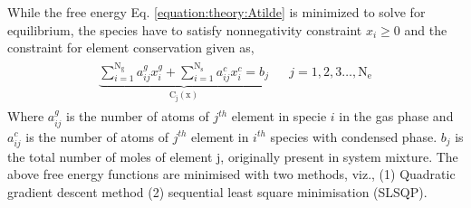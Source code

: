 \documentclass[letterpaper,10pt,english]{sphinxmanual}
\begin{document}
While the free energy Eq. \eqref{equation:theory:Atilde} is minimized to solve for
equilibrium, the species have to satisfy non\sphinxhyphen{}negativity
constraint \(x_i\ge 0\) and the constraint for element
conservation given as,
\begin{equation}\label{equation:theory:constraint_equation}
\begin{split}\begin{align}
\underbrace{\sum_{i = 1}^{\mathrm{N_g}} a_{ij}^{g}
x_{i}^{g} + \sum _{i = 1}^{\mathrm{N_s}} a_{ij}^{c}x_{i}^{c} =
b_j}_{\mathrm{C_j(x)}}            &&j = 1, 2, 3\ldots, \mathrm{N_e}
\end{align}\end{split}
\end{equation}
Where \(a_{ij} ^{g}\) is the number of atoms of \(j^{th}\) element in
specie \(i\) in the gas phase and \(a_{ij}^{c}\) is the number of atoms
of \(j^{th}\) element in \(i^{th}\) species with
condensed phase. \(b_j\) is the total number of moles of element j, originally present in system mixture.
The above free energy functions are minimised with two methods, viz., (1)
Quadratic gradient descent method (2) sequential least square minimisation
(SLSQP).
\end{document}
